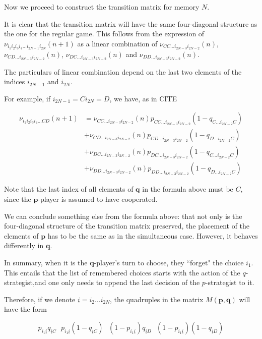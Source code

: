 \documentclass{article}
\def\p{\mathbf{p}}
\def\q{\mathbf{q}}
\theoremstyle{definition}
\numberwithin{equation}{section}
\begin{document}
Now we proceed to construct the transition matrix for memory $N$. 


It is clear that the transition matrix will have the same four-diagonal structure as the one for the regular game. This follows from the expression of  $\nu_{i_1 i_2i_3 i_4\ldots i_{2N-1} i_{2N}}(n+1)$ as a linear combination of $\nu_{CC\ldots i_{2N-3} i_{2N-2}}(n)$,  $\nu_{CD\ldots i_{2N-3} i_{2N-2}}(n)$, $\nu_{DC\ldots i_{2N-3} i_{2N-2}}(n)$ and $\nu_{DD\ldots i_{2N-3} i_{2N-2}}(n)$. 

The particulars of linear combination depend on the last two elements of the indices $i_{2N-1}$ and $i_{2N}$. 

For example, if $i_{2N-1} = C i_{2N}= D$, we have, as in CITE
\begin{small}
    \begin{equation}
        \begin{split}
         \nu_{i_1 i_2i_3 i_4\ldots CD}(n+1)  &= \nu_{CC\ldots i_{2N-3} i_{2N-2}}(n) p_{CC\ldots i_{2N-3} i_{2N-2}}(1- q_{C\ldots i_{2N-2} C}) \\&+ \nu_{CD\ldots i_{2N-3} i_{2N-2}}(n) p_{CD\ldots i_{2N-3} i_{2N-2}}(1- q_{D\ldots i_{2N-2} C})\\&+\nu_{DC\ldots i_{2N-3} i_{2N-2}}(n) p_{DC\ldots i_{2N-3} i_{2N-2}}(1- q_{C\ldots i_{2N-2} C})\\&+\nu_{DD\ldots i_{2N-3} i_{2N-2}}(n) p_{DD\ldots i_{2N-3} i_{2N-2}}(1- q_{D\ldots i_{2N-2} C})
        \end{split}
    \end{equation}
\end{small}
Note that the last index of all elements of $\q$ in the formula above must be $C$, since the $\p$-player is assumed to have cooperated. 

We can conclude something else from the formula above: that not only is the four-diagonal structure of the transition matrix preserved, the placement of the elements of $\p$ has to be the same as in the simultaneous case. However, it behaves differently in $\q$. 


In summary, when it is the $\q$-player's turn to choose, they ``forget" the choice $i_1$.  This entails that the list of remembered choices starts with the action of the $q$-strategist,and one only needs to append the last decision of the $p$-strategist to it. 

Therefore, if we denote $\underline{i} = i_2\ldots i_{2N}$, the quadruples in the matrix $M(\p,\q)$ will have the form 
\begin{small}
\[
p_{i_1\underline{i}}q _{\underline{i}C} \ \ \ p_{i_1\underline{i}}(1-q _{\underline{i}C}) \ \ \  (1-p_{i_1\underline{i}})q _{\underline{i}D} \ \ \ (1-p_{i_1\underline{i}})(1-q _{\underline{i}D}) 
\]
\end{small}
\end{document}
